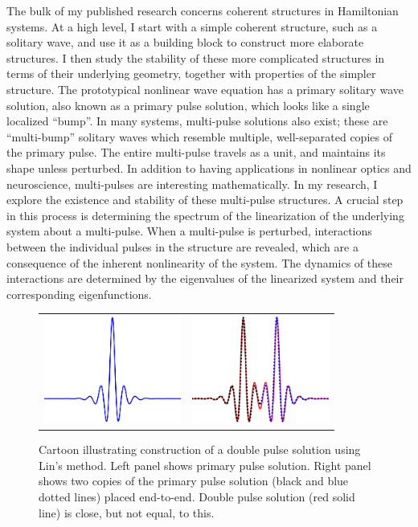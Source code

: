 \documentclass[11pt,reqno,oneside]{article}
\theoremstyle{definition}
\theoremstyle{remark}
\begin{document}
The bulk of my published research concerns coherent structures in Hamiltonian systems. At a high level, I start with a simple coherent structure, such as a solitary wave, and use it as a building block to construct more elaborate structures. I then study the stability of these more complicated structures in terms of their underlying geometry, together with properties of the simpler structure. The prototypical nonlinear wave equation has a primary solitary wave solution, also known as a primary pulse solution, which looks like a single localized ``bump''. In many systems, multi-pulse solutions also exist; these are ``multi-bump'' solitary waves which resemble multiple, well-separated copies of the primary pulse. The entire multi-pulse travels as a unit, and maintains its shape unless perturbed. In addition to having applications in nonlinear optics and neuroscience, multi-pulses are interesting mathematically. In my research, I explore the existence and stability of these multi-pulse structures. A crucial step in this process is determining the spectrum of the linearization of the underlying system about a multi-pulse. When a multi-pulse is perturbed, interactions between the individual pulses in the structure are revealed, which are a consequence of the inherent nonlinearity of the system. The dynamics of these interactions are determined by the eigenvalues of the linearized system and their corresponding eigenfunctions.

\begin{figure}
    \centering
    \begin{tabular}{cc}
        \includegraphics[width=4.5cm]{images/linchen1.png} &
        \includegraphics[width=4.5cm]{images/linchen2.png} 
    \end{tabular}
    \caption{Cartoon illustrating construction of a double pulse solution using Lin's method. Left panel shows primary pulse solution. Right panel shows two copies of the primary pulse solution (black and blue dotted lines) placed end-to-end. Double pulse solution (red solid line) is close, but not equal, to this.}
    \label{fig:linsmethod}
\end{figure}
\end{document}
